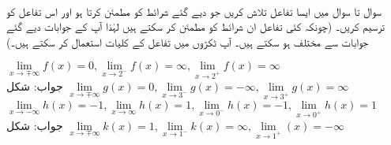 \\
سوال  تا سوال  میں ایسا تفاعل تلاش کریں جو دیے گئے شرائط کو مطمئن کرتا ہو اور اس تفاعل کو ترسیم کریں۔ (چونکہ کئی تفاعل ان شرائط کو مطمئن کر سکتے ہیں لہٰذا آپ کے جوابات دیے گئے جوابات سے مختلف ہو سکتے ہیں۔ آپ ٹکڑوں میں تفاعل کے کلیات استعمال کر سکتے ہیں۔)  

$\lim\limits_{x\to\mp\infty}f(x)=0, \lim\limits_{x\to 2^-}f(x)=\infty,\lim\limits_{x\to 2^+}f(x)=\infty$\\
جواب:\quad
شکل 
$\lim\limits_{x\to\mp\infty}g(x)=0, \lim\limits_{x\to 3^-}g(x)=-\infty,\lim\limits_{x\to 3^+}g(x)=\infty$
$\lim\limits_{x\to-\infty}h(x)=-1, \lim\limits_{x\to \infty}h(x)=1,\lim\limits_{x\to 0^-}h(x)=-1,\lim\limits_{x\to 0^+}h(x)=1$\\
جواب:\quad
شکل 
$\lim\limits_{x\to\mp\infty}k(x)=1, \lim\limits_{x\to 1^-}k(x)=\infty,\lim\limits_{x\to 1^+}(x)=-\infty$
